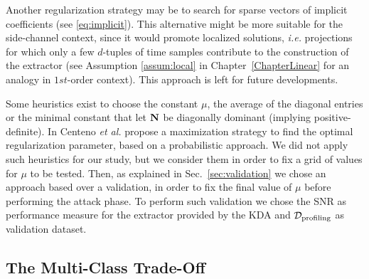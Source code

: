 \begin{remark}
Another regularization strategy may be to search for sparse vectors of implicit coefficients (see \eqref{eq:implicit}). This alternative might be more suitable for the side-channel context, since it would promote localized solutions, \emph{i.e.} projections for which only a few $d$-tuples of time samples contribute to the construction of the extractor (see Assumption \ref{assum:local} in Chapter~\ref{ChapterLinear} for an analogy in $1st$-order context). This approach is left for future developments.
\end{remark} 


Some heuristics exist to choose the constant $\mu$, \eg the average of the diagonal entries \cite{multiclassLDA} or the minimal constant that let $\textbf{N}$ be diagonally dominant (implying positive-definite). In \cite{centeno2006optimising} Centeno \emph{et al.} propose a maximization strategy to find the optimal regularization parameter, based on a probabilistic approach. We did not apply such heuristics for our study, but we consider them in order to fix a grid of values for $\mu$ to be tested. Then, as explained in Sec.~\ref{sec:validation} we chose an approach based over a validation, in order to fix the final value of $\mu$ before performing the attack phase. To perform such validation we chose the SNR as performance measure for the extractor provided by the KDA and $\mathcal{D}_{\text{profiling}}$ as validation dataset.


\subsection{The Multi-Class Trade-Off}\label{sec:multiclass}

